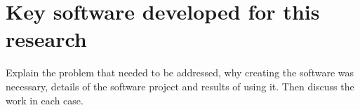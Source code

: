 \chapter{Key software developed for this research}

\href{section-drilling-down-into-analytics}{}


Explain the problem that needed to be addressed, why creating the software was necessary, details of the software project and results of using it. Then discuss the work in each case.

